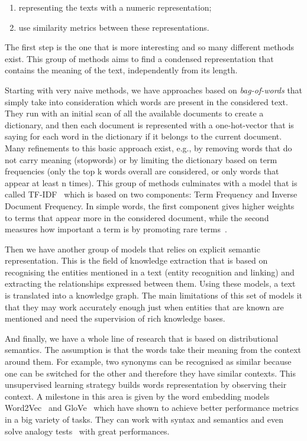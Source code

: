 \begin{enumerate}
    \item representing the texts with a numeric representation;
    \item use similarity metrics between these representations.
\end{enumerate}

The first step is the one that is more interesting and so many different methods exist.
This group of methods aims to find a condensed representation that contains the meaning of the text, independently from its length.

Starting with very naive methods, we have approaches based on \emph{bag-of-words} that simply take into consideration which words are present in the considered text.
They run with an initial scan of all the available documents to create a dictionary, and then each document is represented with a one-hot-vector that is saying for each word in the dictionary if it belongs to the current document.
Many refinements to this basic approach exist, e.g., by removing words that do not carry meaning (stopwords) or by limiting the dictionary based on term frequencies (only the top k words overall are considered, or only words that appear at least n times).
This group of methods culminates with a model that is called TF-IDF~\cite{jones1972statistical} which is based on two components: Term Frequency and Inverse Document Frequency.
In simple words, the first component gives higher weights to terms that appear more in the considered document, while the second measures how important a term is by promoting rare terms~\cite{jones1972statistical}.

Then we have another group of models that relies on explicit semantic representation. This is the field of knowledge extraction that is based on recognising the entities mentioned in a text (entity recognition and linking) and extracting the relationships expressed between them. Using these models, a text is translated into a knowledge graph.
The main limitations of this set of models it that they may work accurately enough just when entities that are known are mentioned and need the supervision of rich knowledge bases.

And finally, we have a whole line of research that is based on distributional semantics.
The assumption is that the words take their meaning from the context around them. For example, two synonyms can be recognised as similar because one can be switched for the other and therefore they have similar contexts.
This unsupervised learning strategy builds words representation by observing their context.
A milestone in this area is given by the word embedding models Word2Vec~\cite{mikolov2013efficient} and GloVe~\cite{pennington2014glove} which have shown %
to achieve better performance metrics in a big variety of tasks.
They can work with syntax and semantics and even solve analogy tests~\cite{mikolov2013efficient} with great performances.

